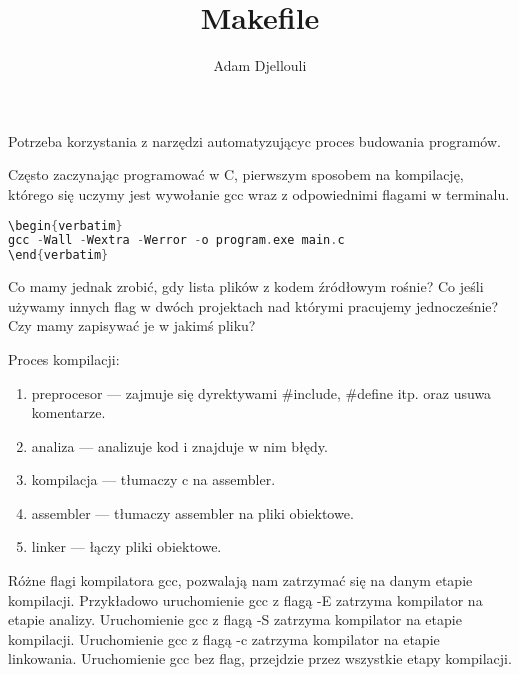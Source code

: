 \documentclass[notheorems, aspectratio=54]{beamer}
\title[Makefile]{Makefile}
\author{Adam Djellouli}
\begin{document}
\begin{frame}
    \titlepage
\end{frame}

\begin{frame}
Potrzeba korzystania z narzędzi automatyzującyc proces budowania programów. 

Często zaczynając programować w C, pierwszym sposobem na kompilację, którego się uczymy jest
wywołanie gcc wraz z odpowiednimi flagami w terminalu.

\begin{lstlisting}[language=C++]
\begin{verbatim}
gcc -Wall -Wextra -Werror -o program.exe main.c
\end{verbatim}
\end{lstlisting}

Co mamy jednak zrobić, gdy lista plików z kodem źródłowym rośnie? Co jeśli używamy innych 
flag w dwóch projektach nad którymi pracujemy jednocześnie? Czy mamy zapisywać je w jakimś
pliku?

\end{frame}

\begin{frame}
Proces kompilacji:

\begin{enumerate}
\item preprocesor — zajmuje się dyrektywami #include, #define itp. oraz usuwa komentarze.
\item analiza — analizuje kod i znajduje w nim błędy.
\item kompilacja — tłumaczy c na assembler.
\item assembler — tłumaczy assembler na pliki obiektowe.
\item linker — łączy pliki obiektowe.
\end{enumerate}

Różne flagi kompilatora gcc, pozwalają nam zatrzymać się na danym etapie kompilacji. Przykładowo 
uruchomienie gcc z flagą -E zatrzyma kompilator na etapie analizy. Uruchomienie gcc z flagą -S 
zatrzyma kompilator na etapie kompilacji. Uruchomienie gcc z flagą -c zatrzyma kompilator na
etapie linkowania. Uruchomienie gcc bez flag, przejdzie przez wszystkie etapy kompilacji.

\end{frame}
\end{document}
